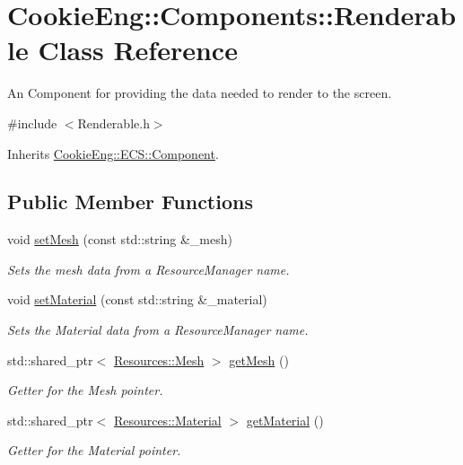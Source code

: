\hypertarget{class_cookie_eng_1_1_components_1_1_renderable}{}\section{Cookie\+Eng\+:\+:Components\+:\+:Renderable Class Reference}
\label{class_cookie_eng_1_1_components_1_1_renderable}


An Component for providing the data needed to render to the screen.  




{\ttfamily \#include $<$Renderable.\+h$>$}



Inherits \hyperlink{class_cookie_eng_1_1_e_c_s_1_1_component}{Cookie\+Eng\+::\+E\+C\+S\+::\+Component}.

\subsection*{Public Member Functions}
\begin{DoxyCompactItemize}
\item 
void \hyperlink{class_cookie_eng_1_1_components_1_1_renderable_a4b9903e0bfb81ec574d022d7b2c198af}{set\+Mesh} (const std\+::string \&\+\_\+mesh)
\begin{DoxyCompactList}\small\item\em Sets the mesh data from a Resource\+Manager name. \end{DoxyCompactList}\item 
void \hyperlink{class_cookie_eng_1_1_components_1_1_renderable_a5ea9d1153bbe51b264c20102f8c72db9}{set\+Material} (const std\+::string \&\+\_\+material)
\begin{DoxyCompactList}\small\item\em Sets the Material data from a Resource\+Manager name. \end{DoxyCompactList}\item 
std\+::shared\+\_\+ptr$<$ \hyperlink{struct_cookie_eng_1_1_resources_1_1_mesh}{Resources\+::\+Mesh} $>$ \hyperlink{class_cookie_eng_1_1_components_1_1_renderable_a37002e38b2ea9a39c31dc5d610ce827b}{get\+Mesh} ()
\begin{DoxyCompactList}\small\item\em Getter for the Mesh pointer. \end{DoxyCompactList}\item 
std\+::shared\+\_\+ptr$<$ \hyperlink{class_cookie_eng_1_1_resources_1_1_material}{Resources\+::\+Material} $>$ \hyperlink{class_cookie_eng_1_1_components_1_1_renderable_a578ffbbc5b4245ade613d0dcfa571413}{get\+Material} ()
\begin{DoxyCompactList}\small\item\em Getter for the Material pointer. \end{DoxyCompactList}\end{DoxyCompactItemize}

